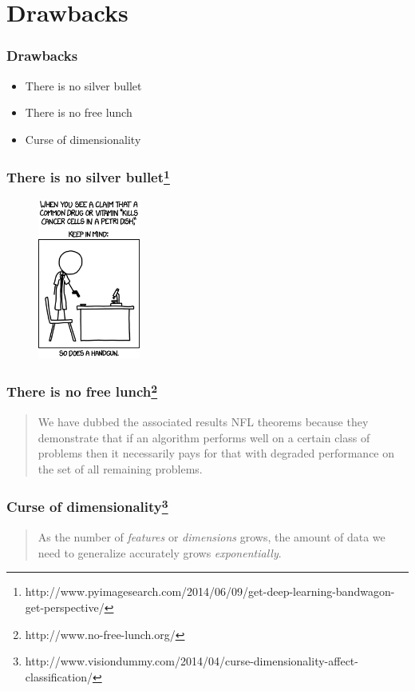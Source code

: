 \documentclass{beamer}
\begin{document}
\section{Drawbacks}
\begin{frame}
\frametitle{Drawbacks}
\begin{itemize}
\item There is no silver bullet
\item There is no free lunch
\item Curse of dimensionality 
\end{itemize}
\end{frame}

\begin{frame}
	\frametitle{There is no silver bullet\footnote[frame]{http://www.pyimagesearch.com/2014/06/09/get-deep-learning-bandwagon-get-perspective/}}
	\begin{figure}
		\centering
		\includegraphics[keepaspectratio, width=0.3\textwidth]{graphics/silverBullet}
	\end{figure}
\end{frame}

\begin{frame}
	\frametitle{There is no free lunch\footnote[frame]{http://www.no-free-lunch.org/}}
	\begin{quote}
	We have dubbed the associated results NFL theorems because they demonstrate that if an algorithm performs well on a certain class of problems then it necessarily pays for that with degraded performance on the set of all remaining problems.	
	\end{quote}
\end{frame}

\begin{frame}
	\frametitle{Curse of dimensionality\footnote[frame]{http://www.visiondummy.com/2014/04/curse-dimensionality-affect-classification/}}
\begin{quote}
	As the number of \emph{features} or \emph{dimensions} grows, the amount of data we need to generalize accurately grows \emph{exponentially}.
\end{quote}
\end{frame}
\end{document}
